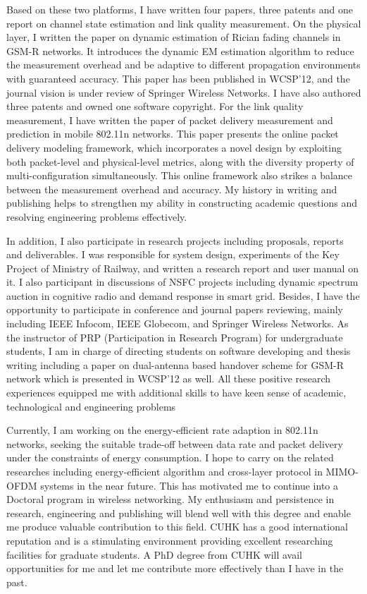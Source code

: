\documentclass[conference,onecolumn]{IEEEtran}
\begin{document}
Based on these two platforms, I have written four papers, three patents and one report on channel state estimation and link quality measurement. On the physical layer, I written the paper on dynamic estimation of Rician fading channels in GSM-R networks. It introduces the dynamic EM estimation algorithm to reduce the measurement overhead and be adaptive to different propagation environments with guaranteed accuracy. This paper has been published in WCSP'12, and the journal vision is under review of Springer Wireless Networks. I have also authored three patents and owned one software copyright. For the link quality measurement, I have written the paper of packet delivery measurement and prediction in mobile 802.11n networks. This paper presents the online packet delivery modeling framework, which incorporates a novel design by exploiting both packet-level and physical-level metrics, along with the diversity property of multi-configuration simultaneously. This online framework also strikes a balance between the measurement overhead and accuracy. My history in writing and publishing helps to strengthen my ability in constructing academic questions and resolving engineering problems effectively.

In addition, I also participate in research projects including proposals, reports and deliverables. I was responsible for system design, experiments of the Key Project of Ministry of Railway, and written a research report and user manual on it. I also participant in discussions of NSFC projects including dynamic spectrum auction in cognitive radio and demand response in smart grid. Besides, I have the opportunity to participate in conference and journal papers reviewing, mainly including IEEE Infocom, IEEE Globecom, and Springer Wireless Networks. As the instructor of PRP (Participation in Research Program) for undergraduate students, I am in charge of directing students on software developing and thesis writing including a paper on dual-antenna based handover scheme for GSM-R network which is presented in WCSP'12 as well. All these positive research experiences equipped me with additional skills to have keen sense of academic, technological and engineering problems

Currently, I am working on the energy-efficient rate adaption in 802.11n networks, seeking the suitable trade-off between data rate and packet delivery under the constraints of energy consumption. I hope to carry on the related researches including energy-efficient algorithm and cross-layer protocol in MIMO-OFDM systems in the near future. This has motivated me to continue into a Doctoral program in wireless networking. My enthusiasm and persistence in research, engineering and publishing will blend well with this degree and enable me produce valuable contribution to this field. CUHK has a good international reputation and is a stimulating environment providing excellent researching facilities for graduate students. A PhD degree from CUHK will avail opportunities for me and let me contribute more effectively than I have in the past.
\end{document}
